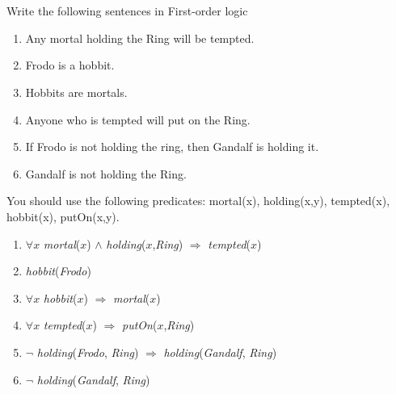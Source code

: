 \documentclass[paper=a4, fontsize=11pt]{scrartcl} %
\begin{document}
\maketitle %

\section{}

\begin{fancyquotes}
  Write the following sentences in First-order logic

  \begin{enumerate}
    \item Any mortal holding the Ring will be tempted.
    \item Frodo is a hobbit.
    \item Hobbits are mortals.
    \item Anyone who is tempted will put on the Ring.
    \item If Frodo is not holding the ring, then Gandalf is holding it.
    \item Gandalf is not holding the Ring.
  \end{enumerate}

  You should use the following predicates: mortal(x), holding(x,y),
  tempted(x), hobbit(x), putOn(x,y).
\end{fancyquotes}

\begin{enumerate}
\item $\forall x$ \textit{mortal}($x$) $\land$
  \textit{holding}($x$,\textit{Ring}) $\Rightarrow$
  \textit{tempted}($x$)
\item \textit{hobbit}(\textit{Frodo})
\item $\forall x$ \textit{hobbit}($x$) $\Rightarrow$
  \textit{mortal}($x$)
\item $\forall x$ \textit{tempted}($x$) $\Rightarrow$
  \textit{putOn}($x$,\textit{Ring})
\item $\lnot$ \textit{holding}(\textit{Frodo}, \textit{Ring})
  $\Rightarrow$ \textit{holding}(\textit{Gandalf}, \textit{Ring})
\item $\lnot$ \textit{holding}(\textit{Gandalf}, \textit{Ring})
\end{enumerate}

\end{document}

